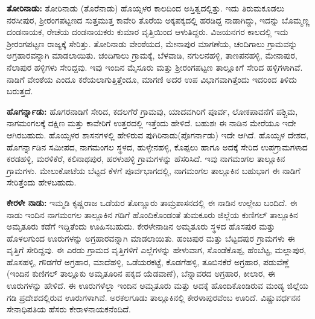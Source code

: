 \textbf{ತೋರಿನಾಡು:} ತೋರಿನಾಡು (ತೊರೆನಾಡು) ಹೊಯ್ಸಳರ ಕಾಲದಿಂದ ಅಸ್ತಿತ್ವದಲ್ಲಿತ್ತು. ಇದು ತಿರುಮಕೂಡಲು ನರಸೀಪುರ, ಶ‍್ರೀರಂಗಪಟ್ಟಣದ ಸುತ್ತಮುತ್ತ ಕಾವೇರಿ ತೊರೆಯ ಅಕ್ಕಪಕ್ಕದಲ್ಲಿ ಹರಡಿದ್ದ ನಾಡಾಗಿದ್ದು, ಇದನ್ನು ಬೊಮ್ಮಣ್ಣ ದಂಡನಾಯಕ, ರೇಚೆಯ ದಂಡನಾಯಕರು ಕುಮಾರ ವೃತ್ತಿಯಿಂದ ಆಳುತಿದ್ದರು. ವಿಜಯನಗರ ಕಾಲದಲ್ಲಿ ಇದು ಶ‍್ರೀರಂಗಪಟ್ಟಣ ರಾಜ್ಯಕ್ಕೆ ಸೇರಿತ್ತು. ತೋರಿನಾಡು ವೇಂಠೆಯದ, ಮೇನಾಪುರ ಮಾಗಣೆಯ, ಚಂದಿಗಾಲು ಗ್ರಾಮವನ್ನು ಅಗ್ರಹಾರವನ್ನಾಗಿ ಮಾಡಲಾಯಿತು. ಚಂದಿಗಾಲು ಗ್ರಾಮಕ್ಕೆ, ಬೆಳವಾಡಿ, ನಗುಲನಹಳ್ಳಿ, ತಾಣಪನಹಳ್ಳಿ, ಮೇನಾಪುರ, ನೆಲಾಪುರ ಹಳ್ಳಿಗಳು ಸೇರಿದ್ದವು. ಇವು ಇಂದಿನ ಮೈಸೂರು ಮತ್ತು ಶ‍್ರೀರಂಗಪಟ್ಟಣ ತಾಲ್ಲೂಕಿಗೆ ಸೇರಿದ ಹಳ್ಳಿಗಳಾಗಿವೆ. ನಾಡಿಗೆ ವೇಂಠೆಯ ಎಂದೂ ಕರೆಯಲಾಗುತ್ತಿತ್ತೆಂದೂ, ಮಾಗಣಿ ಅದರ ಉಪ ವಿಭಾಗವಾಗಿತ್ತೆಂದು ಇದರಿಂದ ತಿಳಿದು ಬರುತ್ತದೆ.

\textbf{ಹೊಗರ್ನ್ನಾಡು:} ಹೊಗರನಾಡಿಗೆ ಸೇರಿದ, ಕದಲಗೆರೆ ಗ್ರಾಮವು, ಯಾದವಗಿರಿಗೆ ಪೂರ್ವ, ಲೋಕಪಾವನೆಗೆ ಪಶ್ಚಿಮ, ನಾಗಮಂಗಲಕ್ಕೆ ದಕ್ಷಿಣ ಮತ್ತು ಕಾವೇರಿಗೆ ಉತ್ತರದಲ್ಲಿ ಇತ್ತೆಂದು ಹೇಳಿದೆ. ಬಹುಶಃ ಈ ನಾಡಿನ ಮೇರೆಯೂ ಇದೇ ಆಗಿರಬಹುದು. ಹೊಯ್ಸಳರ ಶಾಸನಗಳಲ್ಲಿ ಹೇಳಿರುವ ಪುಗಿರಿನಾಡು(ಪೊಗರ್ನಾಡು) ಇದೇ ಆಗಿದೆ. ಹೊಯ್ಸಳ ದೇಶದ, ಹೊಗರ್ನ್ನಾಡಿನ ಸಮೀಪದ, ನಾಗಮಂಗಲ ಸ್ಥಳದ, ಹುಳ್ಳೇನಹಳ್ಳಿ, ಕೊಪ್ಪಲು ಹಾಗೂ ಅದಕ್ಕೆ ಸೇರಿದ ಉಪಗ್ರಾಮಗಳಾದ ಕರಡಹಳ್ಳಿ, ಮರಳಿಕೆರೆ, ಕಲಿನಾಥಪುರ, ಹರಳುಹಳ್ಳಿ ಗ್ರಾಮಗಳನ್ನು ಹೆಸರಿಸಿದೆ. ಇವು ನಾಗಮಂಗಲ ತಾಲ್ಲೂಕಿನ ಗ್ರಾಮಗಳು. ಮೇಲುಕೋಟೆಯ ಬೆಟ್ಟದ ಕೆಳಗೆ ಪೂರ್ವಭಾಗದಲ್ಲಿ, ನಾಗಮಂಗಲ ತಾಲ್ಲೂಕಿನ ಬಹುಭಾಗ ಈ ನಾಡಿಗೆ ಸೇರಿತ್ತೆಂದು ಹೇಳಬಹುದು.

\textbf{ಕೇರಳೇ ನಾಡು:} ಇಮ್ಮಡಿ ಕೃಷ್ಣರಾಜ ಒಡೆಯರ ತೊಣ್ಣೂರು ತಾಮ್ರಶಾಸನದಲ್ಲಿ ಈ ನಾಡಿನ ಉಲ್ಲೇಖ ಬಂದಿದೆ. ಈ ನಾಡು ಇಂದಿನ ನಾಗಮಂಗಲ ತಾಲ್ಲೂಕಿನ ಗಡಿಗೆ ಹೊಂದಿಕೊಂಡಂತೆ ತುಮಕೂರು ಜಿಲ್ಲೆಯ ಕುಣಿಗಲ್​ ತಾಲ್ಲೂಕಿನ ಅಮೃತೂರು ಕಡೆಗೆ ಇದ್ದಿತೆಂದು ಊಹಿಸಬಹುದು. ಕೇರಳೇನಾಡಿನ ಅಮೃತೂರು ಸ್ಥಳದ ಹೊಸಪುರ ಮತ್ತು ಹೊಳಲಗುಂದ ಊರುಗಳನ್ನು ಅಗ್ರಹಾರವನ್ನಾಗಿ ಮಾಡಲಾಯಿತು. ಹಂಚಿಪುರ ಮತ್ತು ಬೆಟ್ಟದಪುರ ಗ್ರಾಮಗಳು ಈ ವೃತ್ತಿಗೆ ಸೇರಿದ್ದವು. ಈ ಎರಡು ಗ್ರಾಮದ ವೃತ್ತಿಗಳಿಗೆ ಎಲ್ಲೆಗಳನ್ನು ಹೇಳುವಾಗ, ಸೊಂಡೆಕೊಪ್ಪ, ಹೆಂಬೆಟ್ಟ, ಮಲ್ಲಾಪುರ, ಹೊಸಹಳ್ಳಿ, ಗೌಡಗೆರೆ ಅಗ್ರಹಾರ, ಮಾದೆಹಳ್ಳಿ, ಒಡೆಯರಕಟ್ಟೆ, ಕೊಡಗೆಹಳ್ಳಿ, ತೂಬಿನಕೆರೆ ಅಗ್ರಹಾರ, ಪಡುವೆಣ್ಣೆ (ಇಂದಿನ ಕುಣಿಗಲ್​ ತಾಲ್ಲೂಕು ಅಮೃತೂರಿನ ಪಕ್ಕದ ಯೆಡವಾಣೆ), ಬೆನ್ನಾವರದ ಅಗ್ರಹಾರ, ಕೀಲಾರ, ಈ ಊರುಗಳನ್ನು ಹೇಳಿದೆ. ಈ ಊರುಗಳೆಲ್ಲಾ ಇಂದಿನ ಅಮೃತೂರು ಮತ್ತು ಅದಕ್ಕೆ ಹೊಂದಿಕೊಂಡಿರುವ ಮಂಡ್ಯ ಜಿಲ್ಲೆಯ ಗಡಿ ಪ್ರದೇಶದಲ್ಲಿರುವ ಊರುಗಳಾಗಿವೆ. ಅರಕಲಗೂಡು ತಾಲ್ಲೂಕಿನಲ್ಲಿ ಕೇರಳಾಪುರವೆಂಬ ಊರಿದೆ. ವಿಷ್ಣುವರ್ಧನನ ಸೇನಾಧಿಪತಿಯ ಹೆಸರು ಕೇರಾಳನಾಯಕನೆಂದಿದೆ.

